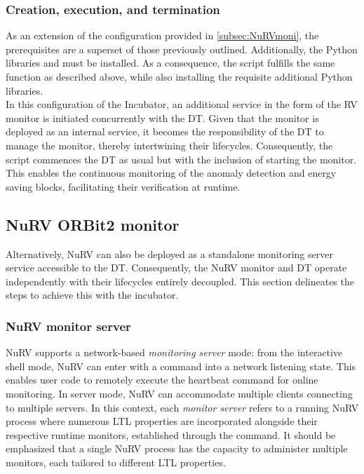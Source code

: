\subsubsection{Creation, execution, and termination}
As an extension of the configuration provided in \cref{subsec:NuRVmoni}, the prerequisites are a superset of those previously outlined.
Additionally, the Python libraries  and  must be installed.
As a consequence, the  script fulfills the same function as described above, while also installing the requisite additional Python libraries.\\
In this configuration of the Incubator, an additional service in the form of the RV monitor is initiated concurrently with the DT.
Given that the monitor is deployed as an internal service, it becomes the responsibility of the DT to manage the monitor, thereby intertwining their lifecycles.
Consequently, the  script commences the DT as usual but with the inclusion of starting the monitor.
This enables the continuous monitoring of the anomaly detection and energy saving blocks, facilitating their verification at runtime.

\subsection{NuRV ORBit2 monitor}\label{subsec:NuRVORBIT}
Alternatively, NuRV can also be deployed as a standalone monitoring server service accessible to the DT.
Consequently, the NuRV monitor and DT operate independently with their lifecycles entirely decoupled.
This section delineates the steps to achieve this with the incubator.

\subsubsection{NuRV monitor server}
NuRV supports a network-based \textit{monitoring server} mode: from the interactive shell mode, NuRV can enter with a command into a network listening state. This enables user code to remotely execute the heartbeat command for online monitoring.
In server mode, NuRV can accommodate multiple clients connecting to multiple servers. In this context, each \textit{monitor server} refers to a running NuRV process where numerous LTL properties are incorporated alongside their respective runtime monitors, established through the  command. It should be emphasized that a single NuRV process has the capacity to administer multiple monitors, each tailored to different LTL properties.


